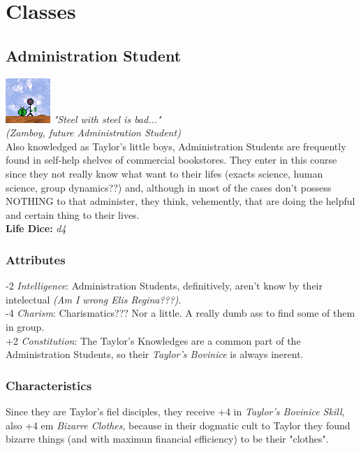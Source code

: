 \documentclass[ letterpaper,12pt]{article}
\begin{document}
\section{Classes}

\subsection{Administration Student}
\includegraphics{../data/classes/Img/administracao.png}
{\it "Steel with steel is bad..."\\(Zamboy, future Administration Student)}\\

Also knowledged as Taylor's  little boys, Administration Students are frequently found  in self-help shelves of commercial bookstores. They enter in this course  since  they not  really know what want to their   lifes  (exacts   science, human science,   group  dynamics??)  and, although  in  most   of  the cases  don't possess NOTHING to that administer,  they think,   vehemently,  that  are doing the helpful and certain thing to their lives.\\ 

{\bf Life Dice:} {\it d4}

\subsubsection{Attributes}
-2 {\it Intelligence}: Administration Students, definitively,  aren't know by their intelectual {\it (Am I wrong Elis Regina???)}.\\
-4 {\it Charism}: Charismatics??? Nor a little. A really dumb ass to find some of them in group.\\
+2 {\it Constitution}: The Taylor's Knowledges are a common part of the Administration Students, so their {\it Taylor's Bovinice} is always inerent.


\subsubsection{Characteristics}
Since they are Taylor's fiel disciples, they receive +4 in {\it Taylor's Bovinice Skill}, also +4 em {\it Bizarre Clothes}, because in their dogmatic cult to Taylor they found bizarre things (and with maximun financial efficiency) to be their "clothes". \\
\end{document}
